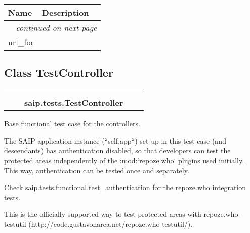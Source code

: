     \vspace{-1cm}
\hspace{\varindent}\begin{longtable}{|p{\varnamewidth}|p{\vardescrwidth}|l}
\cline{1-2}
\cline{1-2} \centering \textbf{Name} & \centering \textbf{Description}& \\
\cline{1-2}
\endhead\cline{1-2}\multicolumn{3}{r}{\small\textit{continued on next page}}\\\endfoot\cline{1-2}
\endlastfoot\raggedright u\-r\-l\-\_\-f\-o\-r\- & &\\
\cline{1-2}
\end{longtable}



\subsection{Class TestController}

    \label{saip:tests:TestController}
\begin{tabular}{cccccc}
\multicolumn{2}{r}{\settowidth{\BCL}{object}\multirow{2}{\BCL}{object}}
&&
  \\\cline{3-3}
  &&\multicolumn{1}{c|}{}
&&
  \\
&&\multicolumn{2}{l}{\textbf{saip.tests.TestController}}
\end{tabular}

Base functional test case for the controllers.

The SAIP application instance (``self.app``) set up in this test case (and 
descendants) has authentication disabled, so that developers can test the 
protected areas independently of the :mod:`repoze.who` plugins used 
initially. This way, authentication can be tested once and separately.

Check saip.tests.functional.test\_authentication for the repoze.who 
integration tests.

This is the officially supported way to test protected areas with 
repoze.who-testutil (http://code.gustavonarea.net/repoze.who-testutil/).




